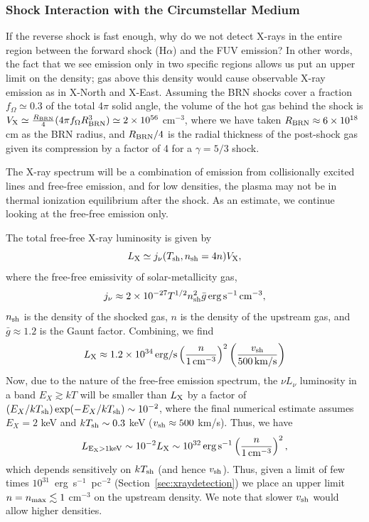 \documentclass[linenumbers]{aastex631}
\newcommand{\be}{\begin{equation}}
\newcommand{\ee}{\end{equation}}
\begin{document}
\subsubsection{Shock Interaction with the Circumstellar Medium}
\label{sec:ISM}
If the reverse shock is fast enough, why do we not detect X-rays in the entire region between the forward shock (H$\alpha$) and the FUV emission? In other words, the fact that we see emission only in two specific regions allows us put an upper limit on the density; gas above this density would cause observable X-ray emission as in X-North and X-East.
Assuming the BRN shocks cover a fraction $f_{\Omega} \simeq 0.3$ of the total 4$\pi$ solid angle,  the volume of the hot gas behind the shock is $V_{\rm X} \simeq \frac{R_{\rm BRN}}{4}(4\pi f_{\Omega} R_{\rm BRN}^{3}) \simeq 2\times 10^{56}$ cm$^{-3}$, where we have taken $R_{\rm BRN} \approx 6\times 10^{18}$ cm as the BRN radius, and $R_{\rm BRN}/4$ is the radial thickness of the post-shock gas given its compression by a factor of 4 for a $\gamma = 5/3$ shock.

The X-ray spectrum will be a combination of emission from collisionally excited lines and free-free emission, and for low densities, the plasma may not be in thermal ionization equilibrium after the shock. As an estimate, we continue looking at the free-free emission only.

The total free-free X-ray luminosity is given by
\be
L_{\rm X} \simeq j_{\nu}(T_{\rm sh},n_{\rm sh} = 4 n)V_{\rm X},
\ee
where the free-free emissivity of solar-metallicity gas,
\be
j_{\nu} \approx 2\times 10^{-27}T^{1/2}n_{\rm sh}^{2}\bar{g}\,{\rm erg\,s^{-1}\,cm^{-3}},
\ee
$n_{\rm sh}$ is the density of the shocked gas, $n$ is the density of the upstream gas, and $\bar{g} \approx 1.2$ is the Gaunt factor.  Combining, we find
\be
L_{\rm X} \approx 1.2\times 10^{34}\,{\rm erg/s}\left(\frac{n}{1\,{\rm cm^{-3}}}\right)^{2}\left(\frac{v_{\rm sh}}{500\,{\rm km/s}}\right)
\ee
Now, due to the nature of the free-free emission spectrum, the $\nu L_{\nu}$ luminosity in a band $E_X \gtrsim kT$ will be smaller than $L_{\rm X}$ by a factor of $(E_X/kT_{\rm sh})\exp(-E_X/kT_{\rm sh}) \sim 10^{-2}$, where the final numerical estimate assumes $E_X = 2$ keV and $kT_{\rm sh} \sim 0.3$ keV ($v_{\rm sh} \approx 500$ km/s).  Thus, we have
\be
L_{\rm E_X > 1 keV} \sim 10^{-2}L_{\rm X} \sim 10^{32}\,{\rm erg\,s^{-1}}\left(\frac{n}{1\,{\rm cm^{-3}}}\right)^{2},
\ee
which depends sensitively on $kT_{\rm sh}$ (and hence $v_{\rm sh}$).  Thus, given a limit
of few times $10^{31}$~erg~s$^{-1}$~pc$^{-2}$ (Section~\ref{sec:xraydetection})
we place an upper limit $n = n_{\rm max} \lesssim 1$ cm$^{-3}$ on the upstream density. We note that slower $v_{\rm sh}$ would allow higher densities.
\end{document}
